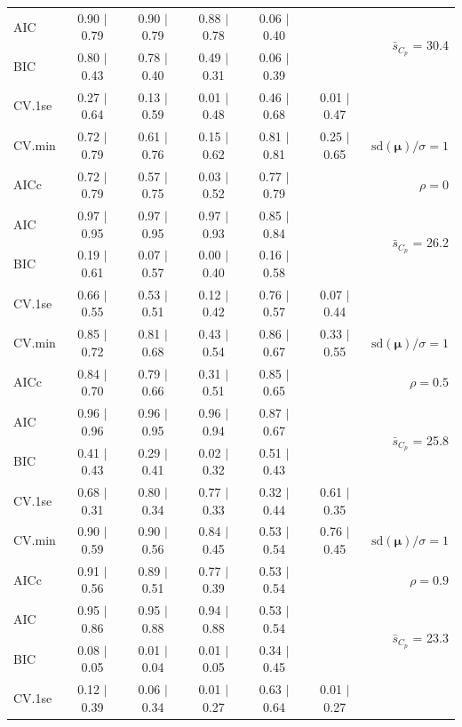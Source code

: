 \documentclass[12pt]{article}
\newcommand{\mr}[1]{\mathrm{#1}}
\newcommand{\bm}[1]{\mathbf{#1}}
\begin{document}
\begin{table}[p]
\begin{center}
\begin{tabular}{l*{5}{c}|r}
AIC & 0.90 $\mid$ 0.79 & 0.90 $\mid$ 0.79 & 0.88 $\mid$ 0.78 & 0.06 $\mid$ 0.40 & & \multirow{2}{*}{$\bar{s}_{C_p}$ = 30.4} \\
BIC & 0.80 $\mid$ 0.43 & 0.78 $\mid$ 0.40 & 0.49 $\mid$ 0.31 & 0.06 $\mid$ 0.39 & & \\
 \hline 
CV.1se & 0.27 $\mid$ 0.64 & 0.13 $\mid$ 0.59 & 0.01 $\mid$ 0.48 & 0.46 $\mid$ 0.68 & 0.01 $\mid$ 0.47 &\\
CV.min & 0.72 $\mid$ 0.79 & 0.61 $\mid$ 0.76 & 0.15 $\mid$ 0.62 & 0.81 $\mid$ 0.81 & 0.25 $\mid$ 0.65 &  $\mr{sd}(\bm{\mu})/\sigma=1$ \\
AICc & 0.72 $\mid$ 0.79 & 0.57 $\mid$ 0.75 & 0.03 $\mid$ 0.52 & 0.77 $\mid$ 0.79 & & $\rho=0$ \\
AIC & 0.97 $\mid$ 0.95 & 0.97 $\mid$ 0.95 & 0.97 $\mid$ 0.93 & 0.85 $\mid$ 0.84 & & \multirow{2}{*}{$\bar{s}_{C_p}$ = 26.2} \\
BIC & 0.19 $\mid$ 0.61 & 0.07 $\mid$ 0.57 & 0.00 $\mid$ 0.40 & 0.16 $\mid$ 0.58 & & \\
 \hline 
CV.1se & 0.66 $\mid$ 0.55 & 0.53 $\mid$ 0.51 & 0.12 $\mid$ 0.42 & 0.76 $\mid$ 0.57 & 0.07 $\mid$ 0.44 &\\
CV.min & 0.85 $\mid$ 0.72 & 0.81 $\mid$ 0.68 & 0.43 $\mid$ 0.54 & 0.86 $\mid$ 0.67 & 0.33 $\mid$ 0.55 &  $\mr{sd}(\bm{\mu})/\sigma=1$ \\
AICc & 0.84 $\mid$ 0.70 & 0.79 $\mid$ 0.66 & 0.31 $\mid$ 0.51 & 0.85 $\mid$ 0.65 & & $\rho=0.5$ \\
AIC & 0.96 $\mid$ 0.96 & 0.96 $\mid$ 0.95 & 0.96 $\mid$ 0.94 & 0.87 $\mid$ 0.67 & & \multirow{2}{*}{$\bar{s}_{C_p}$ = 25.8} \\
BIC & 0.41 $\mid$ 0.43 & 0.29 $\mid$ 0.41 & 0.02 $\mid$ 0.32 & 0.51 $\mid$ 0.43 & & \\
 \hline 
CV.1se & 0.68 $\mid$ 0.31 & 0.80 $\mid$ 0.34 & 0.77 $\mid$ 0.33 & 0.32 $\mid$ 0.44 & 0.61 $\mid$ 0.35 &\\
CV.min & 0.90 $\mid$ 0.59 & 0.90 $\mid$ 0.56 & 0.84 $\mid$ 0.45 & 0.53 $\mid$ 0.54 & 0.76 $\mid$ 0.45 &  $\mr{sd}(\bm{\mu})/\sigma=1$ \\
AICc & 0.91 $\mid$ 0.56 & 0.89 $\mid$ 0.51 & 0.77 $\mid$ 0.39 & 0.53 $\mid$ 0.54 & & $\rho=0.9$ \\
AIC & 0.95 $\mid$ 0.86 & 0.95 $\mid$ 0.88 & 0.94 $\mid$ 0.88 & 0.53 $\mid$ 0.54 & & \multirow{2}{*}{$\bar{s}_{C_p}$ = 23.3} \\
BIC & 0.08 $\mid$ 0.05 & 0.01 $\mid$ 0.04 & 0.01 $\mid$ 0.05 & 0.34 $\mid$ 0.45 & & \\
 \hline 
CV.1se & 0.12 $\mid$ 0.39 & 0.06 $\mid$ 0.34 & 0.01 $\mid$ 0.27 & 0.63 $\mid$ 0.64 & 0.01 $\mid$ 0.27 &\\

\end{tabular}
\end{center}
\end{table}
\end{document}
